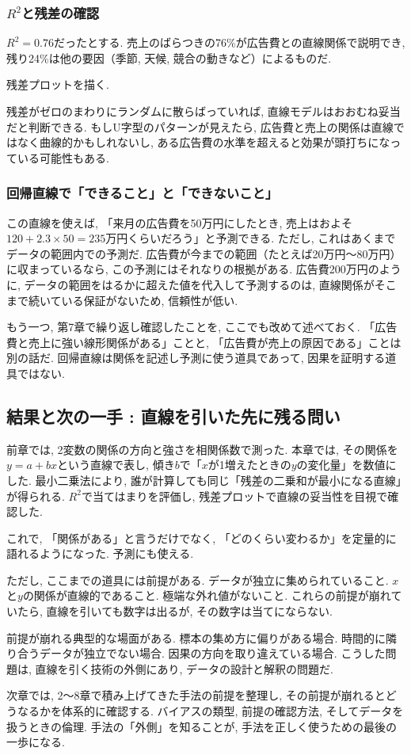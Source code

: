 \subsubsection*{$R^2$と残差の確認}

$R^2 = 0.76$だったとする.
売上のばらつきの76\%が広告費との直線関係で説明でき, 残り24\%は他の要因（季節, 天候, 競合の動きなど）によるものだ.

残差プロットを描く.


残差がゼロのまわりにランダムに散らばっていれば, 直線モデルはおおむね妥当だと判断できる.
もしU字型のパターンが見えたら, 広告費と売上の関係は直線ではなく曲線的かもしれないし, ある広告費の水準を超えると効果が頭打ちになっている可能性もある.

\subsubsection*{回帰直線で「できること」と「できないこと」}

この直線を使えば, 「来月の広告費を50万円にしたとき, 売上はおよそ$120 + 2.3 \times 50 = 235$万円くらいだろう」と予測できる.
ただし, これはあくまでデータの範囲内での予測だ.
広告費が今までの範囲（たとえば20万円〜80万円）に収まっているなら, この予測にはそれなりの根拠がある.
広告費200万円のように, データの範囲をはるかに超えた値を代入して予測するのは, 直線関係がそこまで続いている保証がないため, 信頼性が低い.

もう一つ, 第7章で繰り返し確認したことを, ここでも改めて述べておく.
「広告費と売上に強い線形関係がある」ことと, 「広告費が売上の原因である」ことは別の話だ.
回帰直線は関係を記述し予測に使う道具であって, 因果を証明する道具ではない.


\subsection{結果と次の一手 : 直線を引いた先に残る問い}

前章では, 2変数の関係の方向と強さを相関係数で測った.
本章では, その関係を$y = a + bx$という直線で表し, 傾き$b$で「$x$が1増えたときの$y$の変化量」を数値にした.
最小二乗法により, 誰が計算しても同じ「残差の二乗和が最小になる直線」が得られる.
$R^2$で当てはまりを評価し, 残差プロットで直線の妥当性を目視で確認した.

これで, 「関係がある」と言うだけでなく, 「どのくらい変わるか」を定量的に語れるようになった.
予測にも使える.

ただし, ここまでの道具には前提がある.
データが独立に集められていること.
$x$と$y$の関係が直線的であること.
極端な外れ値がないこと.
これらの前提が崩れていたら, 直線を引いても数字は出るが, その数字は当てにならない.

前提が崩れる典型的な場面がある.
標本の集め方に偏りがある場合.
時間的に隣り合うデータが独立でない場合.
因果の方向を取り違えている場合.
こうした問題は, 直線を引く技術の外側にあり, データの設計と解釈の問題だ.

次章では, 2〜8章で積み上げてきた手法の前提を整理し, その前提が崩れるとどうなるかを体系的に確認する.
バイアスの類型, 前提の確認方法, そしてデータを扱うときの倫理.
手法の「外側」を知ることが, 手法を正しく使うための最後の一歩になる.

